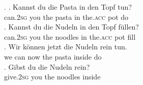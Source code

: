 \ex. \ag. Kannst du die Pasta in den Topf tun?\\
can.\textsc{2sg} you the pasta in the.\textsc{acc} pot do\\
\bg. Kannst du die Nudeln in den Topf füllen?\\
can.\textsc{2sg} you the noodles in the.\textsc{acc} pot fill\\
\cg. Wir können jetzt die Nudeln rein tun.\\
we can now the pasta inside do\\
\dg. Gibst du die Nudeln rein?\\
give.\textsc{2sg} you the noodles inside\\

